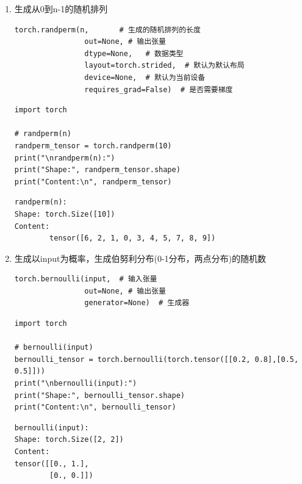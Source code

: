 \begin{enumerate}[label=\arabic*)]
\begin{lstlisting}[style=pythonstyle]
# randint(low, high, *size)
rand_tensor = torch.randint(low=3, high=10, size=(2, 3))
print("\nrand(*size):")
print("Shape:", rand_tensor.shape)
print("Content:\n", rand_tensor)

print("-----------------------------")
# randint_like(input)
rand_like_tensor = torch.randint_like(low=5, high=10, input=rand_tensor)
print("\nrand_like(input):")
print("Shape:", rand_like_tensor.shape)
print("Content:\n", rand_like_tensor)
\end{lstlisting} 
\begin{lstlisting}[style=demostyle,numbers=none]
rand(*size):
Shape: torch.Size([2, 3])
Content:
tensor([[7, 6, 9],
        [8, 7, 9]])
-----------------------------

rand_like(input):
Shape: torch.Size([2, 3])
Content:
tensor([[5, 7, 7],
        [8, 7, 7]])
\end{lstlisting}

\item 生成从0到n-1的随机排列
\begin{lstlisting}[style=demostyle,numbers=none]
torch.randperm(n,       # 生成的随机排列的长度
                out=None, # 输出张量
                dtype=None,   # 数据类型
                layout=torch.strided,  # 默认为默认布局
                device=None,  # 默认为当前设备
                requires_grad=False)  # 是否需要梯度
\end{lstlisting}
\begin{lstlisting}[style=pythonstyle]
import torch

# randperm(n)
randperm_tensor = torch.randperm(10)
print("\nrandperm(n):")
print("Shape:", randperm_tensor.shape)
print("Content:\n", randperm_tensor)
\end{lstlisting}
\begin{lstlisting}[style=demostyle,numbers=none]
randperm(n):
Shape: torch.Size([10])
Content:
        tensor([6, 2, 1, 0, 3, 4, 5, 7, 8, 9])
\end{lstlisting}

\item 生成以input为概率，生成伯努利分布(0-1分布，两点分布)的随机数
\begin{lstlisting}[style=demostyle,numbers=none]
torch.bernoulli(input,  # 输入张量
                out=None, # 输出张量
                generator=None)  # 生成器
\end{lstlisting}
\begin{lstlisting}[style=pythonstyle]
import torch

# bernoulli(input)
bernoulli_tensor = torch.bernoulli(torch.tensor([[0.2, 0.8],[0.5, 0.5]]))
print("\nbernoulli(input):")
print("Shape:", bernoulli_tensor.shape)
print("Content:\n", bernoulli_tensor)
\end{lstlisting}
\begin{lstlisting}[style=demostyle,numbers=none]
bernoulli(input):
Shape: torch.Size([2, 2])
Content:
tensor([[0., 1.],
        [0., 0.]])
\end{lstlisting}


\end{enumerate}
